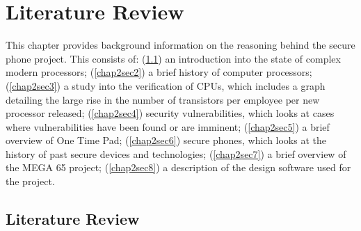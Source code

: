 
\chapter{Literature Review} %

\label{Chapter2} %

This chapter provides background information on the reasoning behind the secure phone project.
This consists of: (\ref{chap2sec1}) an introduction into the state of complex modern processors; (\ref{chap2sec2}) a brief history of computer processors; (\ref{chap2sec3}) a study into the verification of CPUs, which includes a graph detailing the large rise in the number of transistors per employee per new processor released; (\ref{chap2sec4}) security vulnerabilities, which looks at cases where vulnerabilities have been found or are imminent; (\ref{chap2sec5}) a brief overview of One Time Pad; (\ref{chap2sec6}) secure phones, which looks at the history of past secure devices and technologies; (\ref{chap2sec7}) a brief overview of the MEGA 65 project; (\ref{chap2sec8}) a description of the design software used for the project.\\


\section{Literature Review}
\label{chap2sec1}

